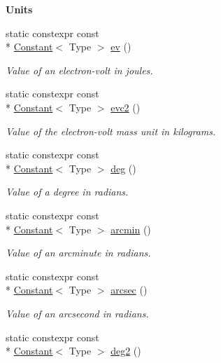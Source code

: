 \begin{Indent}{\bf Units}
\begin{DoxyCompactItemize}
static constexpr const \\*
\hyperlink{exceptionmagrathea_1_1Constant}{Constant}$<$ Type $>$ \hyperlink{exceptionmagrathea_1_1Constants_ae16d4ac0727fae4f63c93f77842c9572}{ev} ()
\begin{DoxyCompactList}\small\item\em Value of an electron-\/volt in joules. \end{DoxyCompactList}\item 
static constexpr const \\*
\hyperlink{exceptionmagrathea_1_1Constant}{Constant}$<$ Type $>$ \hyperlink{exceptionmagrathea_1_1Constants_ab558e3564cb85b621bfff94f2338b3a1}{evc2} ()
\begin{DoxyCompactList}\small\item\em Value of the electron-\/volt mass unit in kilograms. \end{DoxyCompactList}\item 
static constexpr const \\*
\hyperlink{exceptionmagrathea_1_1Constant}{Constant}$<$ Type $>$ \hyperlink{exceptionmagrathea_1_1Constants_ae72c81f8b099a68d963577664505ff2d}{deg} ()
\begin{DoxyCompactList}\small\item\em Value of a degree in radians. \end{DoxyCompactList}\item 
static constexpr const \\*
\hyperlink{exceptionmagrathea_1_1Constant}{Constant}$<$ Type $>$ \hyperlink{exceptionmagrathea_1_1Constants_aed7bafe3740ac53a8de3b67cceaadde4}{arcmin} ()
\begin{DoxyCompactList}\small\item\em Value of an arcminute in radians. \end{DoxyCompactList}\item 
static constexpr const \\*
\hyperlink{exceptionmagrathea_1_1Constant}{Constant}$<$ Type $>$ \hyperlink{exceptionmagrathea_1_1Constants_a6a1fa76a1998e1a4705d20465b983983}{arcsec} ()
\begin{DoxyCompactList}\small\item\em Value of an arcsecond in radians. \end{DoxyCompactList}\item 
static constexpr const \\*
\hyperlink{exceptionmagrathea_1_1Constant}{Constant}$<$ Type $>$ \hyperlink{exceptionmagrathea_1_1Constants_aec1e155065c8262f6bcb1a5f77928e23}{deg2} ()

\end{DoxyCompactItemize}
\end{Indent}
